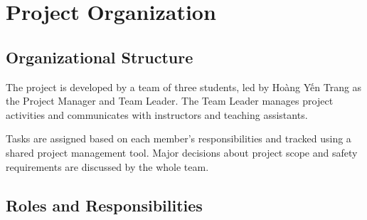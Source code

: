 

\section{Project Organization}



\subsection{Organizational Structure}

The project is developed by a team of three students,
led by Hoàng Yến Trang as the Project Manager and Team Leader.
The Team Leader manages project activities and communicates
with instructors and teaching assistants.

Tasks are assigned based on each member's responsibilities
and tracked using a shared project management tool.
Major decisions about project scope and safety requirements
are discussed by the whole team.




\subsection{Roles and Responsibilities}

